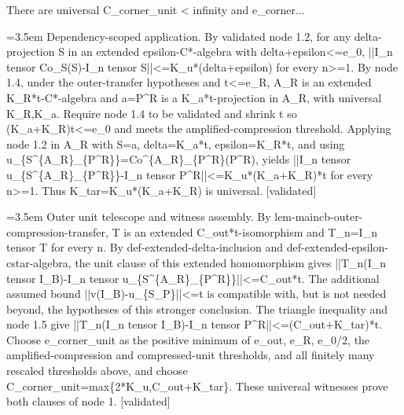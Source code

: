 \documentclass{article}
\newcommand{\step}[1]{\par\noindent\hangindent=3.5em\hangafter=1%
  \makebox[3.5em][l]{\textbf{#1.}}}
\newcommand{\steptag}[1]{\hfill{\small\textsf{[#1]}}}
\begin{document}
\begin{proofbox}{There are universal C\_corner\_unit < infinity and e\_corner...}
\step{1.5.1} Dependency-scoped application. By validated node 1.2, for any delta-projection S in an extended epsilon-C*-algebra with delta+epsilon<=e\_0, ||I\_n tensor Co\_S(S)-I\_n tensor S||<=K\_u*(delta+epsilon) for every n>=1. By node 1.4, under the outer-transfer hypotheses and t<=e\_R, A\_R is an extended K\_R*t-C*-algebra and a=P\textasciicircum{}R is a K\_a*t-projection in A\_R, with universal K\_R,K\_a. Require node 1.4 to be validated and shrink t so (K\_a+K\_R)t<=e\_0 and meets the amplified-compression threshold. Applying node 1.2 in A\_R with S=a, delta=K\_a*t, epsilon=K\_R*t, and using u\_\{S\textasciicircum{}\{A\_R\}\_\{P\textasciicircum{}R\}\}=Co\textasciicircum{}\{A\_R\}\_\{P\textasciicircum{}R\}(P\textasciicircum{}R), yields ||I\_n tensor u\_\{S\textasciicircum{}\{A\_R\}\_\{P\textasciicircum{}R\}\}-I\_n tensor P\textasciicircum{}R||<=K\_u*(K\_a+K\_R)*t for every n>=1. Thus K\_tar=K\_u*(K\_a+K\_R) is universal. \steptag{validated} \\[4pt]
\step{1.6} Outer unit telescope and witness assembly. By lem-maincb-outer-compression-transfer, T is an extended C\_out*t-isomorphism and T\_n=I\_n tensor T for every n. By def-extended-delta-inclusion and def-extended-epsilon-cstar-algebra, the unit clause of this extended homomorphism gives ||T\_n(I\_n tensor I\_B)-I\_n tensor u\_\{S\textasciicircum{}\{A\_R\}\_\{P\textasciicircum{}R\}\}||<=C\_out*t. The additional assumed bound ||v(I\_B)-u\_\{S\_P\}||<=t is compatible with, but is not needed beyond, the hypotheses of this stronger conclusion. The triangle inequality and node 1.5 give ||T\_n(I\_n tensor I\_B)-I\_n tensor P\textasciicircum{}R||<=(C\_out+K\_tar)*t. Choose e\_corner\_unit as the positive minimum of e\_out, e\_R, e\_0/2, the amplified-compression and compressed-unit thresholds, and all finitely many rescaled thresholds above, and choose C\_corner\_unit=max\{2*K\_u,C\_out+K\_tar\}. These universal witnesses prove both clauses of node 1. \steptag{validated} \\[6pt]

\end{proofbox}
\end{document}
